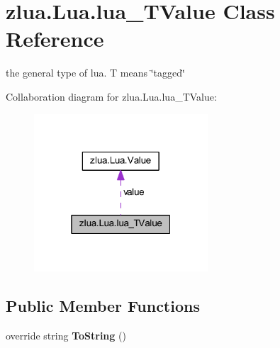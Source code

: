 \hypertarget{classzlua_1_1_lua_1_1lua___t_value}{}\section{zlua.\+Lua.\+lua\+\_\+\+T\+Value Class Reference}
\label{classzlua_1_1_lua_1_1lua___t_value}


the general type of lua. T means \char`\"{}tagged\char`\"{}  




Collaboration diagram for zlua.\+Lua.\+lua\+\_\+\+T\+Value\+:
\nopagebreak
\begin{figure}[H]
\begin{center}
\leavevmode
\includegraphics[width=184pt]{classzlua_1_1_lua_1_1lua___t_value__coll__graph}
\end{center}
\end{figure}
\subsection*{Public Member Functions}
\begin{DoxyCompactItemize}
\item 
\mbox{\label{classzlua_1_1_lua_1_1lua___t_value_af471597f82937b2394ed4ecf15f3c102}} 
override string {\bfseries To\+String} ()
\end{DoxyCompactItemize}

